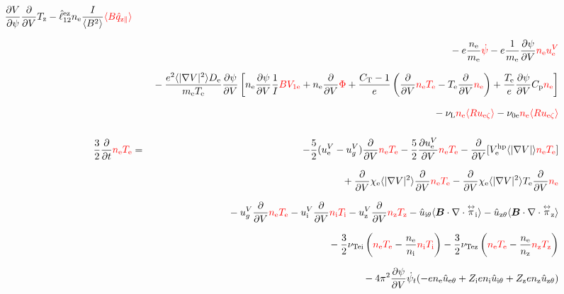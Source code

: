 \documentclass[11pt]{article}
\def\bvec#1{\leavevmode\hbox{\boldmath$#1$}}
\let\vec=\bvec
\def\r#1{{\rm#1}}
\def\aves#1{\langle#1\rangle}
\def\dd#1#2{\frac{\partial #1}{\partial #2}}
\def\tensor#1{\mathord{\displaystyle\mathop{#1}^\leftrightarrow}}
\def\para{\parallel}
\def\ddV{\frac{\partial}{\partial V}}
\def\ddt{\frac{\partial}{\partial t}}
\def\psid{\dot{\psi}}
\def\psit{\psi_t}
\def\psitd{\dot{\psit}}
\def\me{m_\r{e}}
\def\nee{n_\r{e}}
\def\ni{n_\r{i}}
\def\nz{n_\r{z}}
\def\Te{T_\r{e}}
\def\Ti{T_\r{i}}
\def\Tz{T_\r{z}}
\def\Zi{Z_\r{i}}
\def\Zz{Z_\r{z}}
\def\uzt#1{u_{\r{#1}\zeta}}
\def\upara#1{u_{\r{#1}\para}}
\def\uhatth#1{\hat{u}_{\r{#1}\theta}}
\def\qhatpara#1{\hat{q}_{\r{#1}\para}}
\def\uV#1{u_\r{#1}^V}
\def\ugV{u_{g}^V}
\def\chis#1{\chi_\r{#1}}
\def\De{D_\r{e}}
\def\nun#1{\nu_\r{0#1}}
\def\bri{\aves{B^2}\aves{R^2} - I^2}
\def\nuL{\nu_\r{L}}
\def\red#1{\textcolor{red}{#1}}
\begin{document}
\begin{eqnarray}
    \dd{V}{\psi} \ddV \Tz
  - \hat{\ell}_{12}^\r{ez} \nee \frac{I}{\aves{B^2}} \red{\aves{B \qhatpara{z}}}
\nonumber\\[2.5mm]&&{}
%
  - e \frac{\nee}{\me} \red{\psid}
%
  - e \frac{1}{\me} \dd{\psi}{V} \red{\nee \uV{e}}
%
\nonumber\\[2.5mm]&&{}
%
  - \frac{e^2 \aves{|\nabla V|^2} \De}{\me\Te} \dd{\psi}{V} 
%
  \left[ \nee \dd{\psi}{V} \frac{1}{I} \red{B V_{1\r{e}}}
       + \nee \ddV \red{\Phi}
       + \frac{C_\r{T}-1}{e} \left( \ddV \red{\nee \Te} - \Te \ddV
				    \red{\nee} \right)
       + \frac{\Te}{e} \dd{\psi}{V} C_\r{p} \red{\nee} \right]
\nonumber\\[2.5mm]&&{}
  - \nuL  \red{\nee \aves{R \uzt{e}}}
%
  - \nun{e} \red{\nee \aves{R \uzt{e}}}
\\[5mm]
 \frac{3}{2} \ddt \red{\nee \Te} &=& 
%
  - \frac{5}{2} ( \uV{e} - \ugV ) \ddV \red{\nee \Te}
%
  - \frac{5}{2} \dd{\uV{e}}{V} \red{\nee \Te}
%
  - \ddV [V_\r{e}^\r{hp} \aves{|\nabla V|}   \red{\nee \Te}]
\nonumber\\[2.5mm]&&{}
%
  + \ddV \chis{e} \aves{|\nabla V|^2}\ddV \red{\nee \Te}
  - \ddV \chis{e} \aves{|\nabla V|^2}\Te \ddV \red{\nee}
\nonumber\\[2.5mm]&&{}
%
  - \ugV   \ddV \red{\nee \Te}
  - \uV{i} \ddV \red{\ni  \Ti}
  - \uV{z} \ddV \red{\nz  \Tz}
%
  - \uhatth{i} \aves{\vec{B}\cdot\nabla\cdot\tensor{\pi}_\r{i}}
  - \uhatth{z} \aves{\vec{B}\cdot\nabla\cdot\tensor{\pi}_\r{z}}
\nonumber\\[2.5mm]&&{}
%
  - \frac{3}{2} \nu_\r{Tei} \left(\red{\nee \Te} - \frac{\nee}{\ni} \red{\ni \Ti}\right)
  - \frac{3}{2} \nu_\r{Tez} \left(\red{\nee \Te} - \frac{\nee}{\nz} \red{\nz \Tz}\right)
\nonumber\\[2.5mm]&&{}
%
%
%
  - 4\pi^2 \dd{\psi}{V} \dot{\psi}_t 
  (-    e \nee \uhatth{e} + \Zi e \ni  \uhatth{i} + \Zz e \nz  \uhatth{z})

\end{eqnarray}
\end{document}
